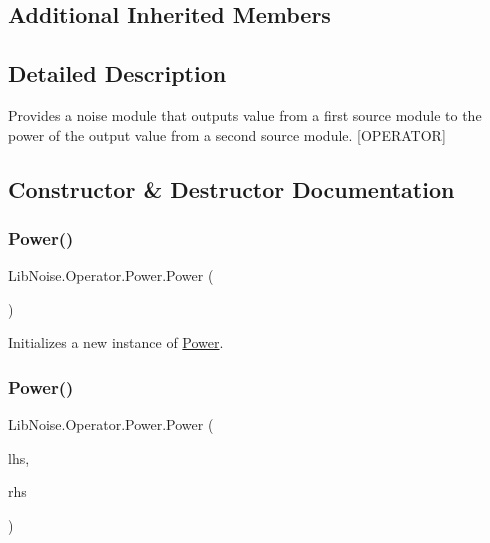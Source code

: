 \subsection*{Additional Inherited Members}


\subsection{Detailed Description}
Provides a noise module that outputs value from a first source module to the power of the output value from a second source module. \mbox{[}O\+P\+E\+R\+A\+T\+OR\mbox{]} 



\subsection{Constructor \& Destructor Documentation}
\mbox{\label{class_lib_noise_1_1_operator_1_1_power_a7bd48c1282db7041bcefb4c3da91b439}} 
\subsubsection{\texorpdfstring{Power()}{Power()}\hspace{0.1cm}{\footnotesize\ttfamily [1/2]}}
{\footnotesize\ttfamily Lib\+Noise.\+Operator.\+Power.\+Power (\begin{DoxyParamCaption}{ }\end{DoxyParamCaption})}



Initializes a new instance of \hyperlink{class_lib_noise_1_1_operator_1_1_power}{Power}. 

\mbox{\label{class_lib_noise_1_1_operator_1_1_power_aaefef1d576110d91791c827df6528473}} 
\subsubsection{\texorpdfstring{Power()}{Power()}\hspace{0.1cm}{\footnotesize\ttfamily [2/2]}}
{\footnotesize\ttfamily Lib\+Noise.\+Operator.\+Power.\+Power (\begin{DoxyParamCaption}\item[{\hyperlink{class_lib_noise_1_1_module_base}{Module\+Base}}]{lhs,  }\item[{\hyperlink{class_lib_noise_1_1_module_base}{Module\+Base}}]{rhs }\end{DoxyParamCaption})}



